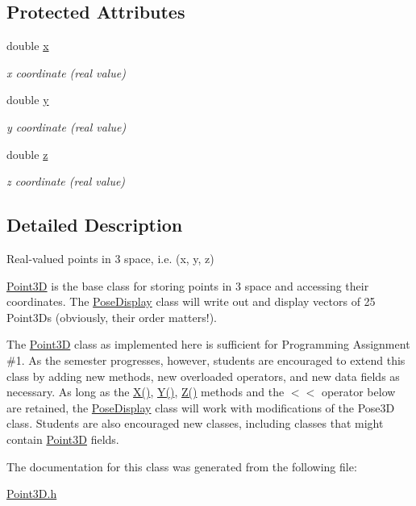 \subsection*{Protected Attributes}
\begin{DoxyCompactItemize}
\item 
\hypertarget{classPoint3D_abf9d1f564d599503cdb114934c7044b7}{}double \hyperlink{classPoint3D_abf9d1f564d599503cdb114934c7044b7}{x}\label{classPoint3D_abf9d1f564d599503cdb114934c7044b7}

\begin{DoxyCompactList}\small\item\em x coordinate (real value) \end{DoxyCompactList}\item 
\hypertarget{classPoint3D_abcb44b06e310b076fa9d65dec8541dd4}{}double \hyperlink{classPoint3D_abcb44b06e310b076fa9d65dec8541dd4}{y}\label{classPoint3D_abcb44b06e310b076fa9d65dec8541dd4}

\begin{DoxyCompactList}\small\item\em y coordinate (real value) \end{DoxyCompactList}\item 
\hypertarget{classPoint3D_a9f4a32e3afccb3c9fe9b5cd88e179c3d}{}double \hyperlink{classPoint3D_a9f4a32e3afccb3c9fe9b5cd88e179c3d}{z}\label{classPoint3D_a9f4a32e3afccb3c9fe9b5cd88e179c3d}

\begin{DoxyCompactList}\small\item\em z coordinate (real value) \end{DoxyCompactList}\end{DoxyCompactItemize}


\subsection{Detailed Description}
Real-\/valued points in 3 space, i.\+e. (x, y, z) 

\hyperlink{classPoint3D}{Point3\+D} is the base class for storing points in 3 space and accessing their coordinates. The \hyperlink{classPoseDisplay}{Pose\+Display} class will write out and display vectors of 25 Point3\+Ds (obviously, their order matters!).

The \hyperlink{classPoint3D}{Point3\+D} class as implemented here is sufficient for Programming Assignment \#1. As the semester progresses, however, students are encouraged to extend this class by adding new methods, new overloaded operators, and new data fields as necessary. As long as the \hyperlink{classPoint3D_ab637223cff9a13531cb82bea70fdf2be}{X()}, \hyperlink{classPoint3D_a0321eefbe2d003c6e5de81557a938711}{Y()}, \hyperlink{classPoint3D_a9de6ff7d82e55b70d3c59c24cf54f2d2}{Z()} methods and the $<$$<$ operator below are retained, the \hyperlink{classPoseDisplay}{Pose\+Display} class will work with modifications of the Pose3\+D class. Students are also encouraged new classes, including classes that might contain \hyperlink{classPoint3D}{Point3\+D} fields. 

The documentation for this class was generated from the following file\+:\begin{DoxyCompactItemize}
\item 
\hyperlink{Point3D_8h}{Point3\+D.\+h}\end{DoxyCompactItemize}
